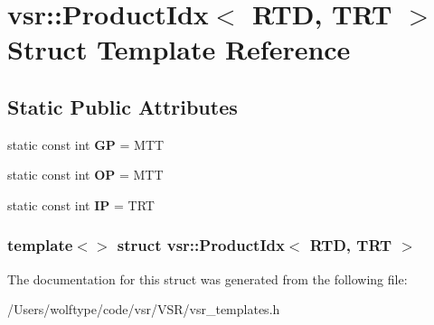 \hypertarget{structvsr_1_1_product_idx_3_01_r_t_d_00_01_t_r_t_01_4}{\section{vsr\-:\-:Product\-Idx$<$ R\-T\-D, T\-R\-T $>$ Struct Template Reference}
\label{structvsr_1_1_product_idx_3_01_r_t_d_00_01_t_r_t_01_4}
}
\subsection*{Static Public Attributes}
\begin{DoxyCompactItemize}
\item 
\hypertarget{structvsr_1_1_product_idx_3_01_r_t_d_00_01_t_r_t_01_4_ace89ddfa1019419094796755f6b32cb5}{static const int {\bfseries G\-P} = M\-T\-T}\label{structvsr_1_1_product_idx_3_01_r_t_d_00_01_t_r_t_01_4_ace89ddfa1019419094796755f6b32cb5}

\item 
\hypertarget{structvsr_1_1_product_idx_3_01_r_t_d_00_01_t_r_t_01_4_a1c30c14345396c0f61bd5e41c1f8bf20}{static const int {\bfseries O\-P} = M\-T\-T}\label{structvsr_1_1_product_idx_3_01_r_t_d_00_01_t_r_t_01_4_a1c30c14345396c0f61bd5e41c1f8bf20}

\item 
\hypertarget{structvsr_1_1_product_idx_3_01_r_t_d_00_01_t_r_t_01_4_a2cfff9a07e39a7f8831735330bd30d25}{static const int {\bfseries I\-P} = T\-R\-T}\label{structvsr_1_1_product_idx_3_01_r_t_d_00_01_t_r_t_01_4_a2cfff9a07e39a7f8831735330bd30d25}

\end{DoxyCompactItemize}
\subsubsection*{template$<$$>$ struct vsr\-::\-Product\-Idx$<$ R\-T\-D, T\-R\-T $>$}



The documentation for this struct was generated from the following file\-:\begin{DoxyCompactItemize}
\item 
/\-Users/wolftype/code/vsr/\-V\-S\-R/vsr\-\_\-templates.\-h\end{DoxyCompactItemize}
